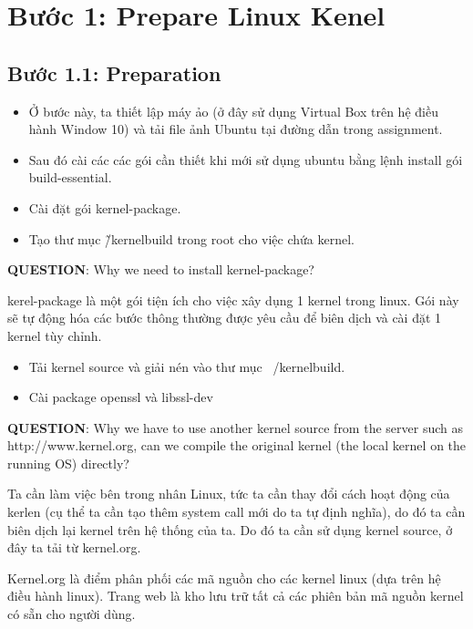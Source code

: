 \section{Bước 1: Prepare Linux Kenel}

\subsection{Bước 1.1: Preparation}

\begin{itemize}
	\item Ở bước này, ta thiết lập máy ảo (ở đây sử dụng Virtual Box trên hệ điều hành Window 10) và tải file ảnh Ubuntu tại đường dẫn trong assignment.
	\item Sau đó cài các các gói cần thiết khi mới sử dụng ubuntu bằng lệnh install gói build-essential.
	\item Cài đặt gói kernel-package.
	\item Tạo thư mục \~/kernelbuild trong root cho việc chứa kernel.
\end{itemize}


\textbf{QUESTION}: Why we need to install kernel-package?

\vspace{0.2cm}

kerel-package là một gói tiện ích cho việc xây dụng 1 kernel trong linux. Gói này sẽ tự động hóa các bước thông thường được yêu cầu để biên dịch và cài đặt 1 kernel tùy chỉnh.

\begin{itemize}
	\item Tải kernel source và giải nén vào thư mục ~/kernelbuild.
	\item Cài package openssl và libssl-dev
\end{itemize}




\textbf{QUESTION}:  Why we have to use another kernel source from the server such as http://www.kernel.org, can we compile the original kernel (the local kernel on the running OS) directly?

\vspace{0.2cm}

Ta cần làm việc bên trong nhân Linux, tức ta cần thay đổi cách hoạt động của kerlen (cụ thể ta cần tạo thêm system call mới do ta tự định nghĩa), do đó ta cần biên dịch lại kernel trên hệ thống của ta. Do đó ta cần sử dụng kernel source, ở đây ta tải từ kernel.org.

Kernel.org là điểm phân phối các mã nguồn cho các kernel linux (dựa trên hệ điều hành linux). Trang web là kho lưu trữ tất cả các phiên bản mã nguồn kernel có sẵn cho người dùng.

